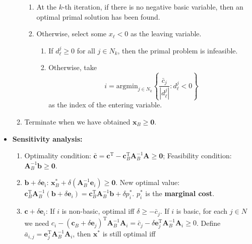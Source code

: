 \documentclass[10pt]{article}
\newcommand{\abs}[1]{\left\lvert#1\right\rvert}
\begin{document}
\begin{multicols*}{3}
\begin{itemize}
\begin{enumerate}
                \begin{enumerate}
                    \item At the $k$-th iteration, if there is no negative basic variable, then an optimal primal solution has been found.
                    \item Otherwise, select some $x_{\ell} < 0$ as the leaving variable.
                    \begin{enumerate}
                        \item If $d^j_{\ell} \geq 0$ for all $j \in N_k$, then the primal problem is infeasible. 
                        \item Otherwise, take 
                        \begin{equation*}
                            i = \mathrm{argmin}_{j \in N_k}\left\{\frac{\bar{c}_j}{\abs{d^j_{\ell}}} \colon d^j_{\ell} < 0\right\}
                        \end{equation*}
                        as the index of the entering variable.
                    \end{enumerate}
                \end{enumerate}
                \item Terminate when we have obtained $\bm{x}_B \geq \mathbf{0}$.   
            \end{enumerate}
            \item \textbf{Sensitivity analysis:}
            \begin{enumerate}
                \item Optimality condition: $\bm{\bar{c}} = \bm{c}^{\mathrm{T}} - \bm{c}_B^{\mathrm{T}}\bm{A}_B^{-1}\bm{A} \geq \mathbf{0}$; Feasibility condition: $\bm{A}_B^{-1}\bm{b} \geq \mathbf{0}$.
                \item $\bm{b} + \delta\bm{e}_i$: $\bm{x}_B^* + \delta\left(\bm{A}_B^{-1}\bm{e}_i\right) \geq \mathbf{0}$. New optimal value: $\bm{c}^{\mathrm{T}}_B\bm{A}_B^{-1}\left(\bm{b} + \delta\bm{e}_i\right) = \bm{c}^{\mathrm{T}}_B\bm{A}_B^{-1}\bm{b} + \delta p^*_i$. $p^*_i$ is the \textbf{marginal cost}.
                \item $\bm{c} + \delta\bm{e}_i$: If $i$ is non-basic, optimal iff $\delta \geq -\bar{c}_j$. If $i$ is basic, for each $j \in N$ we need $c_i - \left(\bm{c}_B + \delta\bm{e}_j\right)^{\mathrm{T}}\bm{A}_B^{-1}\bm{A}_i = \bar{c}_j - \delta\bm{e}_j^{\mathrm{T}}\bm{A}_B^{-1}\bm{A}_i \geq 0$. Define $\bar{a}_{i, j} = \bm{e}_j^{\mathrm{T}}\bm{A}_B^{-1}\bm{A}_i$, then $\bm{x}^*$ is still optimal iff

\end{enumerate}
\end{itemize}
\end{multicols*}
\end{document}
